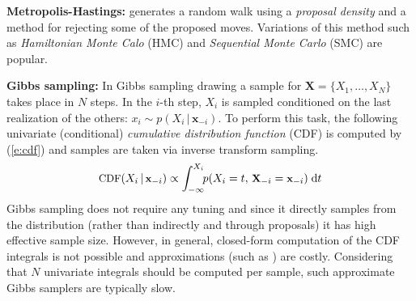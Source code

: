 \documentclass[]{article}
\newcommand{\bvec}[1]{\textbf{#1}}
\newcommand{\pr}{p}
\newcommand{\dd}{\;\mathrm{d}} %
\begin{document}
{\bf Metropolis-Hastings:}
\citep{metropolis1953equation} generates a random walk using a \emph{proposal density} and a method for rejecting some of the proposed moves.
Variations of this method such as \emph{Hamiltonian Monte Calo} (HMC) \citep{neal2011mcmc}  
and \emph{Sequential Monte Carlo} (SMC) \citep{del2006sequential} are popular. 




{\bf Gibbs sampling:}
 In Gibbs  sampling \citep{geman1984stochastic} drawing a sample for $\bvec{X} = \{X_1, \ldots, X_N\}$ takes place in $N$ steps.
In the $i$-th step, $X_i$ is sampled conditioned on the last realization of the others:
$x_i \sim \pr(X_i \,|\, \bvec{x}_{-i})$. 
To perform this task, the following univariate (conditional) \emph{cumulative distribution function} (CDF)
is computed by (\ref{e:cdf}) and samples are taken via inverse transform sampling. 
\begin{equation} \footnotesize
\label{e:cdf}
\text{CDF}(X_i  \,|\, \bvec{x}_{-i}) 
\propto
\int_{-\infty}^{X_i} \!\! \pr(X_i = t, \,\bvec{X}_{-i} = \bvec{x}_{-i})  \dd  t
\end{equation} 
Gibbs sampling does not require any tuning
and since it directly samples from the distribution (rather than indirectly and through proposals) it has high effective sample size. 
However, in general, closed-form computation of the CDF integrals is not possible and 
approximations (such as \cite{gilks1992adaptive}) are costly.
Considering that $N$ univariate integrals should be computed per sample, such approximate Gibbs samplers are typically slow.
 

\end{document}
